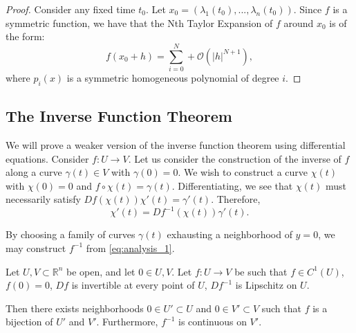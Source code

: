 \begin{proof}

Consider any fixed time $t_0$. Let $x_0 = (\lambda_1(t_0), ..., \lambda_n(t_0)).$ Since $f$ is a symmetric function, we have that the Nth Taylor Expansion of $f$ around $x_0$ is of the form:
\begin{equation}
f(x_0 + h) = \sum\limits_{i=0}^N + \mathcal O( |h|^{N+1}),
\end{equation}
where $p_i(x)$ is a symmetric homogeneous polynomial of degree $i$. 

\end{proof}


\subsection{The Inverse Function Theorem}

We will prove a weaker version of the inverse function theorem using differential equations. Consider $f: U \to V$. Let us consider the construction of the inverse of $f$ along a curve $\gamma(t) \in V$ with $\gamma(0) = 0$. We wish to construct a curve $\chi(t)$ with $\chi(0) = 0$ and $f\circ \chi (t) = \gamma(t)$. Differentiating, we see that $\chi(t)$ must necessarily satisfy $Df(\chi(t))\chi'(t) = \gamma'(t)$. Therefore, 
\begin{equation}\label{eq:analysis_1}
\chi'(t) = Df^{-1}(\chi(t)) \gamma'(t).
\end{equation}

By choosing a family of curves $\gamma(t)$ exhausting a neighborhood of $y=0$, we may construct $f^{-1}$ from \eqref{eq:analysis_1}.

\begin{proposition}
Let $U, V \subset \mathbb R^n$ be open, and let $0\in U, V$. Let $f: U \to V$ be such that $f\in C^1(U)$, $f(0) = 0$, $Df$ is invertible at every point of $U$, $Df^{-1}$ is Lipschitz on $U$.

Then there exists neighborhoods $0\in U' \subset U$ and $0\in V' \subset V$ such that $f$ is a bijection of $U'$ and $V'$. Furthermore, $f^{-1}$ is continuous on $V'$.
\end{proposition}

